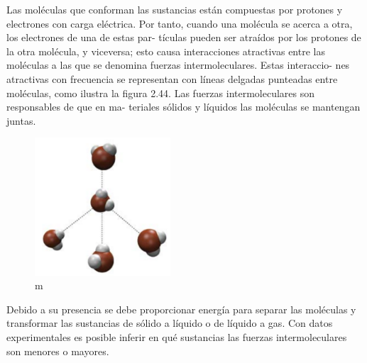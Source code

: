 \documentclass[12pt,addpoints,answers]{guia}
\begin{document}
\begin{questions}
{\begin{tcolorbox}
            Las moléculas que conforman las sustancias están compuestas
            por protones y electrones con carga eléctrica. Por tanto, cuando
            una molécula se acerca a otra, los electrones de una de estas par-
            tículas pueden ser atraídos por los protones de la otra molécula,
            y viceversa; esto causa interacciones atractivas entre las moléculas
            a las que se denomina fuerzas intermoleculares. Estas interaccio-
            nes atractivas con frecuencia se representan con líneas delgadas
            punteadas entre moléculas, como ilustra la figura 2.44.
            Las fuerzas intermoleculares son responsables de que en ma-
            teriales sólidos y líquidos las moléculas se mantengan juntas.
            \begin{figure}[H]
                \includegraphics[width=0.45\textwidth]{../images/20230321054752.png}
                \caption{m}
                \label{fig:20230321054752}
            \end{figure}
            Debido a su presencia se debe proporcionar energía para separar
            las moléculas y transformar las sustancias de sólido a líquido o de
            líquido a gas. Con datos experimentales es posible inferir en qué
            sustancias las fuerzas intermoleculares son menores o mayores.
        \end{tcolorbox}
    }
    \fullwidth{
        \begin{tcolorbox}[enhanced,fit to height=5cm,
                colback=green!25!black!10!white,colframe=green!75!black,title=Fit box (5cm),
                drop fuzzy shadow,watermark color=white,watermark text=Fit]
        \end{tcolorbox}
    }
\end{questions}
\end{document}
